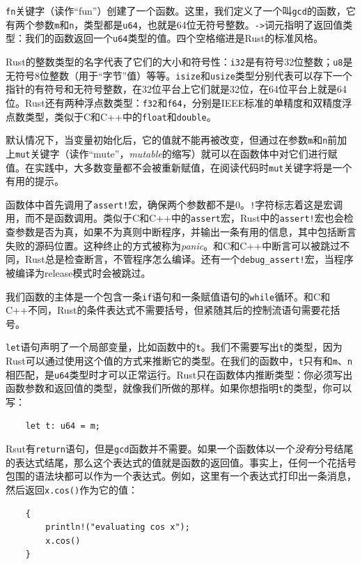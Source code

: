 \texttt{fn}关键字（读作“fun”）创建了一个函数。这里，我们定义了一个叫\texttt{gcd}的函数，它有两个参数\texttt{m}和\texttt{n}，类型都是\texttt{u64}，也就是64位无符号整数。\texttt{->}词元指明了返回值类型：我们的函数返回一个\texttt{u64}类型的值。四个空格缩进是Rust的标准风格。

Rust的整数类型的名字代表了它们的大小和符号性：\texttt{i32}是有符号32位整数；\texttt{u8}是无符号8位整数（用于“字节”值）等等。\texttt{isize}和\texttt{usize}类型分别代表可以存下一个指针的有符号和无符号整数，在32位平台上它们就是32位，在64位平台上就是64位。Rust还有两种浮点数类型：\texttt{f32}和\texttt{f64}，分别是IEEE标准的单精度和双精度浮点数类型，类似于C和C++中的\texttt{float}和\texttt{double}。

默认情况下，当变量初始化后，它的值就不能再被改变，但通过在参数\texttt{m}和\texttt{n}前加上\texttt{mut}关键字（读作“mute”，\emph{mutable}的缩写）就可以在函数体中对它们进行赋值。在实践中，大多数变量都不会被重新赋值，在阅读代码时\texttt{mut}关键字将是一个有用的提示。

函数体中首先调用了\texttt{assert!}宏，确保两个参数都不是0。\texttt{!}字符标志着这是宏调用，而不是函数调用。类似于C和C++中的\texttt{assert}宏，Rust中的\texttt{assert!}宏也会检查参数是否为真，如果不为真则中断程序，并输出一条有用的信息，其中包括断言失败的源码位置。这种终止的方式被称为\emph{panic}。和C和C++中断言可以被跳过不同，Rust总是检查断言，不管程序怎么编译。还有一个\texttt{debug\_assert!}宏，当程序被编译为release模式时会被跳过。

我们函数的主体是一个包含一条\texttt{if}语句和一条赋值语句的\texttt{while}循环。和C和C++不同，Rust的条件表达式不需要括号，但紧随其后的控制流语句需要花括号。

\texttt{let}语句声明了一个局部变量，比如函数中的\texttt{t}。我们不需要写出\texttt{t}的类型，因为Rust可以通过使用这个值的方式来推断它的类型。在我们的函数中，\texttt{t}只有和\texttt{m}、\texttt{n}相匹配，是\texttt{u64}类型时才可以正常运行。Rust只在函数体内推断类型：你必须写出函数参数和返回值的类型，就像我们所做的那样。如果你想指明\texttt{t}的类型，你可以写：
\begin{verbatim}
    let t: u64 = m;
\end{verbatim}

Rsut有\texttt{return}语句，但是\texttt{gcd}函数并不需要。如果一个函数体以一个\emph{没有}分号结尾的表达式结尾，那么这个表达式的值就是函数的返回值。事实上，任何一个花括号包围的语法块都可以作为一个表达式。例如，这里有一个表达式打印出一条消息，然后返回\texttt{x.cos()}作为它的值：
\begin{verbatim}
    {
        println!("evaluating cos x");
        x.cos()
    }
\end{verbatim}

